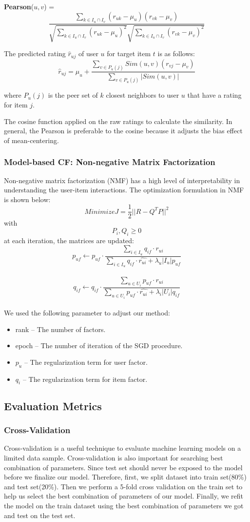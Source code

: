 \documentclass[12pt,journal,compsoc]{IEEEtran}
\begin{document}
{\bf Pearson}($u, v$) = $$\frac{\sum_{k \in I_u \cap I_v} (r_{uk} - \mu_u)(r_{vk}-\mu_v)}{\sqrt{\sum_{k \in I_u \cap I_v}(r_{uk} - \mu_u)^2} \sqrt{\sum_{k \in I_u \cap I_v}(r_{vk} - \mu_v)^2}}$$

The predicted rating $\hat r_{uj}$ of user $u$ for target item $t$ is as follows:
$$\hat r_{uj} = \mu_u + \frac{\sum_{v \in P_u(j)} Sim(u,v) (r_{vj} - \mu_v)}{\sum_{v \in P_u(j)} |Sim(u, v)|}$$

where $P_u(j)$ is the peer set of $k$ closest neighbors to user $u$ that have a rating for item $j$.

The cosine function applied on the raw ratings to calculate the similarity. In general, the Pearson is preferable to the cosine because it adjusts the bias effect of mean-centering. 

\subsubsection{Model-based CF: Non-negative Matrix Factorization}
Non-negative matrix factorization (NMF) has a high level of interpretability in understanding the user-item interactions. The optimization formulation in NMF is shown below:
$$Minimize J = \frac{1}{2}||R-Q^TP||^2$$ with  $$P_i, Q_i \ge 0$$ 
at each iteration, the matrices are updated:
$$p_{uf} \leftarrow p_{uf} \cdot \frac{\sum_{i \in I_u} q_{if}
\cdot r_{ui}}{\sum_{i \in I_u} q_{if} \cdot \hat{r_{ui}} +
\lambda_u |I_u| p_{uf}}$$\\
$$q_{if} \leftarrow q_{if} \cdot \frac{\sum_{u \in U_i} p_{uf}
\cdot r_{ui}}{\sum_{u \in U_i} p_{uf} \cdot \hat{r_{ui}} +
\lambda_i |U_i| q_{if}}$$\\

We used the following parameter to adjust our method:
\begin{itemize}
    \item rank – The number of factors. 
    \item epoch – The number of iteration of the SGD procedure. 
    \item $p_u$ – The regularization term for user factor.
    \item $q_i$ – The regularization term for item factor.
\end{itemize}
\subsection{Evaluation Metrics}

\subsubsection{Cross-Validation}
Cross-validation is a useful technique to evaluate machine learning models on a limited data sample.
Cross-validation is also important for searching best combination of parameters. Since test set should never be exposed to the model before we finalize our model. Therefore, first, we split dataset into train set(80\%) and test set(20\%). Then we perform a 5-fold cross validation on the train set to help us select the best combination of parameters of our model. Finally, we refit the model on the train dataset using the best combination of parameters we got and test on the test set.
\end{document}
